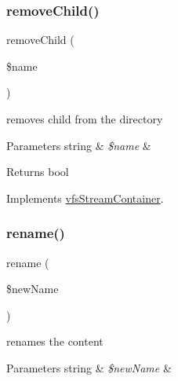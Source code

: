 \mbox{\label{classorg_1_1bovigo_1_1vfs_1_1vfs_stream_directory_a2b20c5390cd11395e9a3d32c8c8e51b6}} 
\subsubsection{\texorpdfstring{remove\+Child()}{removeChild()}}
{\footnotesize\ttfamily remove\+Child (\begin{DoxyParamCaption}\item[{}]{\$name }\end{DoxyParamCaption})}

removes child from the directory


\begin{DoxyParams}[1]{Parameters}
string & {\em \$name} & \\
\hline
\end{DoxyParams}
\begin{DoxyReturn}{Returns}
bool 
\end{DoxyReturn}


Implements \mbox{\hyperlink{interfaceorg_1_1bovigo_1_1vfs_1_1vfs_stream_container_a2b20c5390cd11395e9a3d32c8c8e51b6}{vfs\+Stream\+Container}}.

\mbox{\label{classorg_1_1bovigo_1_1vfs_1_1vfs_stream_directory_ab40397a8b5cf98ff82734ce7b1276363}} 
\subsubsection{\texorpdfstring{rename()}{rename()}}
{\footnotesize\ttfamily rename (\begin{DoxyParamCaption}\item[{}]{\$new\+Name }\end{DoxyParamCaption})}

renames the content


\begin{DoxyParams}[1]{Parameters}
string & {\em \$new\+Name} & \\
\hline
\end{DoxyParams}

